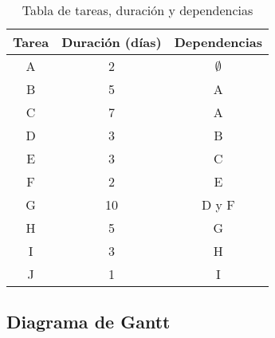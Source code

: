 \begin{table}[hbtp]
    \centering
    \caption{Tabla de tareas, duración y dependencias}
    \label{tab:dependencias}
    \begin{tabular}{@{}ccc@{}}
        \toprule
        \textbf{Tarea} & \textbf{Duración (días)} & \textbf{Dependencias} \\
        \midrule
        A              & 2                        & $\emptyset$           \\
        B              & 5                        & A                     \\
        C              & 7                        & A                     \\
        D              & 3                        & B                     \\
        E              & 3                        & C                     \\
        F              & 2                        & E                     \\
        G              & 10                       & D y F                 \\
        H              & 5                        & G                     \\
        I              & 3                        & H                     \\
        J              & 1                        & I                     \\
        \bottomrule
    \end{tabular}


\end{table}

\deactivatequoting

\subsection{Diagrama de Gantt}\label{subsec:diagrama-de-gantt}

